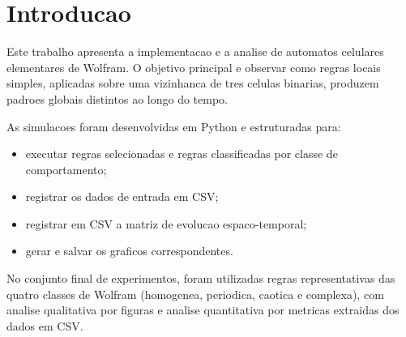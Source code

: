 \chapter{Introducao}
\label{chap_introducao}

Este trabalho apresenta a implementacao e a analise de automatos celulares elementares de Wolfram. O objetivo principal e observar como regras locais simples, aplicadas sobre uma vizinhanca de tres celulas binarias, produzem padroes globais distintos ao longo do tempo.

As simulacoes foram desenvolvidas em Python e estruturadas para:
\begin{itemize}
	\item executar regras selecionadas e regras classificadas por classe de comportamento;
	\item registrar os dados de entrada em CSV;
	\item registrar em CSV a matriz de evolucao espaco-temporal;
	\item gerar e salvar os graficos correspondentes.
\end{itemize}

No conjunto final de experimentos, foram utilizadas regras representativas das quatro classes de Wolfram (homogenea, periodica, caotica e complexa), com analise qualitativa por figuras e analise quantitativa por metricas extraidas dos dados em CSV.
